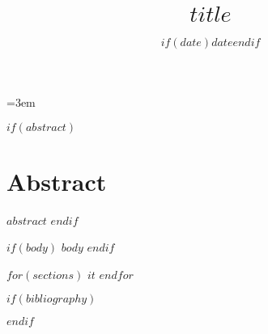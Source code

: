 \documentclass[%
  letterpaper,%
  12pt,%
  $if(lang)$$lang$$else$english$endif$%
]{article}
\title{$title$}
\date{$if(date)$\vspace*{3ex}$date$$endif$}
\begin{document}
\maketitle

\thispagestyle{empty}
\parindent=3em


$if(abstract)$
\section*{Abstract}
$abstract$
$endif$

$if(body)$
$body$
$endif$

$for(sections)$
$it$
$endfor$

$if(bibliography)$
\clearpage
\footnotesize


\normalsize
$endif$


\end{document}
